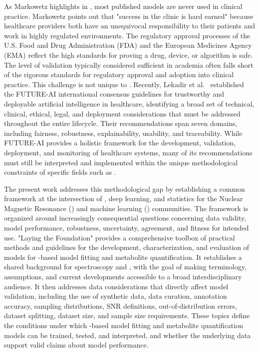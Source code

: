 As Markowetz highlights in \cite{Markowetz2024}, most published models are never used in clinical practice. Markowetz points out that "success in the clinic is hard earned" because healthcare providers both have an unequivocal responsibility to their patients and work in highly regulated environments. The regulatory approval processes of the U.S. Food and Drug Administration (FDA) and the European Medicines Agency (EMA) reflect the high standards for proving a drug, device, or algorithm is safe. The level of validation typically considered sufficient in academia often falls short of the rigorous standards for regulatory approval and adoption into clinical practice. This challenge is not unique to \MRS. Recently, Lekadir et al.~\cite{Lekadir2025} established the FUTURE-AI international consensus guidelines for trustworthy and deployable artificial intelligence in healthcare, identifying a broad set of technical, clinical, ethical, legal, and deployment considerations that must be addressed throughout the entire \AI lifecycle. Their recommendations span seven domains, including fairness, robustness, explainability, usability, and traceability. While FUTURE-AI provides a holistic framework for the development, validation, deployment, and monitoring of healthcare \AI systems, many of its recommendations must still be interpreted and implemented within the unique methodological constraints of specific fields such as \MRS.

The present work addresses this methodological gap by establishing a common framework at the intersection of \MRS, deep learning, and statistics for the Nuclear Magnetic Resonance (\NMR) and machine learning (\ML) communities. The framework is organized around increasingly consequential questions concerning data validity, model performance, robustness, uncertainty, agreement, and fitness for intended use. "Laying the Foundation" provides a comprehensive toolbox of practical methods and guidelines for the development, characterization, and evaluation of models for \DL-based model fitting and metabolite quantification. It establishes a shared background for \MR spectroscopy and \DL, with the goal of making terminology, assumptions, and current developments accessible to a broad interdisciplinary audience. It then addresses data considerations that directly affect model validation, including the use of synthetic data, data curation, annotation accuracy, sampling distributions, SNR definitions, out-of-distribution errors, dataset splitting, dataset size, and sample size requirements. These topics define the conditions under which \DL-based model fitting and metabolite quantification models can be trained, tested, and interpreted, and whether the underlying data support valid claims about model performance.

